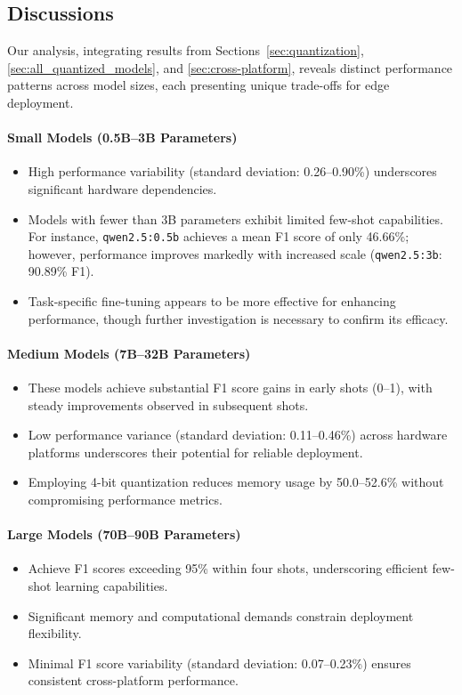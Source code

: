 \documentclass[conference]{IEEEtran}
\begin{document}
\subsection{Discussions}

Our analysis, integrating results from Sections~\ref{sec:quantization}, \ref{sec:all_quantized_models}, and \ref{sec:cross-platform}, reveals distinct performance patterns across model sizes, each presenting unique trade-offs for edge deployment.

\paragraph{Small Models (0.5B--3B Parameters)} 
\begin{itemize}
    \item High performance variability (standard deviation: 0.26--0.90\%) underscores significant hardware dependencies.
    \item Models with fewer than 3B parameters exhibit limited few-shot capabilities. For instance, \texttt{qwen2.5:0.5b} achieves a mean F1 score of only 46.66\%; however, performance improves markedly with increased scale (\texttt{qwen2.5:3b}: 90.89\% F1). 
    \item Task-specific fine-tuning appears to be more effective for enhancing performance, though further investigation is necessary to confirm its efficacy.
\end{itemize}

\paragraph{Medium Models (7B--32B Parameters)} 
\begin{itemize}
    \item These models achieve substantial F1 score gains in early shots (0--1), with steady improvements observed in subsequent shots.
    \item Low performance variance (standard deviation: 0.11--0.46\%) across hardware platforms underscores their potential for reliable deployment.
    \item Employing 4-bit quantization reduces memory usage by 50.0--52.6\% without compromising performance metrics.
\end{itemize}

\paragraph{Large Models (70B--90B Parameters)} 
\begin{itemize}
    \item Achieve F1 scores exceeding 95\% within four shots, underscoring efficient few-shot learning capabilities.
    \item Significant memory and computational demands constrain deployment flexibility.
    \item Minimal F1 score variability (standard deviation: 0.07--0.23\%) ensures consistent cross-platform performance.
\end{itemize}
\end{document}
